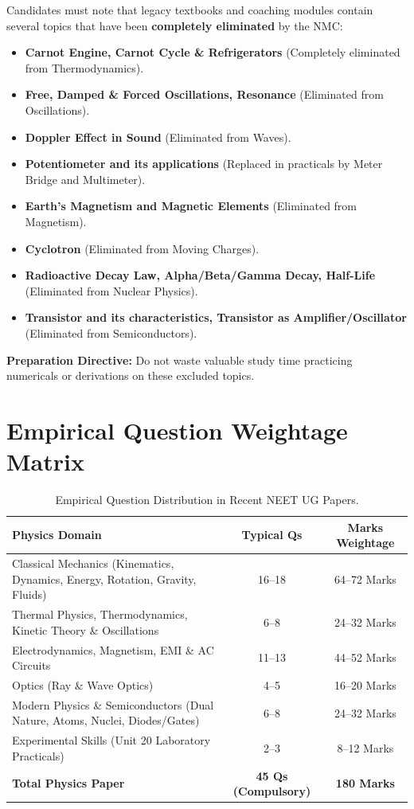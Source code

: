 \documentclass[10pt,twoside,openright]{book}
\begin{document}
\begin{trapbox}
Candidates must note that legacy textbooks and coaching modules contain several topics that have been \textbf{completely eliminated} by the NMC:
\begin{itemize}
  \item \textbf{Carnot Engine, Carnot Cycle \& Refrigerators} (Completely eliminated from Thermodynamics).
  \item \textbf{Free, Damped \& Forced Oscillations, Resonance} (Eliminated from Oscillations).
  \item \textbf{Doppler Effect in Sound} (Eliminated from Waves).
  \item \textbf{Potentiometer and its applications} (Replaced in practicals by Meter Bridge and Multimeter).
  \item \textbf{Earth's Magnetism and Magnetic Elements} (Eliminated from Magnetism).
  \item \textbf{Cyclotron} (Eliminated from Moving Charges).
  \item \textbf{Radioactive Decay Law, Alpha/Beta/Gamma Decay, Half-Life} (Eliminated from Nuclear Physics).
  \item \textbf{Transistor and its characteristics, Transistor as Amplifier/Oscillator} (Eliminated from Semiconductors).
\end{itemize}
\textbf{Preparation Directive:} Do not waste valuable study time practicing numericals or derivations on these excluded topics.
\end{trapbox}

\section*{Empirical Question Weightage Matrix}

\begin{table}[htbp]
\centering
\footnotesize
\setlength{\tabcolsep}{4pt}
\renewcommand{\arraystretch}{1.2}
\begin{tabularx}{\textwidth}{L c c}
\toprule
\textbf{Physics Domain} & \textbf{Typical Qs} & \textbf{Marks Weightage} \\
\midrule
Classical Mechanics (Kinematics, Dynamics, Energy, Rotation, Gravity, Fluids) & 16--18 & 64--72 Marks \\
Thermal Physics, Thermodynamics, Kinetic Theory \& Oscillations & 6--8 & 24--32 Marks \\
Electrodynamics, Magnetism, EMI \& AC Circuits & 11--13 & 44--52 Marks \\
Optics (Ray \& Wave Optics) & 4--5 & 16--20 Marks \\
Modern Physics \& Semiconductors (Dual Nature, Atoms, Nuclei, Diodes/Gates) & 6--8 & 24--32 Marks \\
Experimental Skills (Unit 20 Laboratory Practicals) & 2--3 & 8--12 Marks \\
\midrule
\textbf{Total Physics Paper} & \textbf{45 Qs (Compulsory)} & \textbf{180 Marks} \\
\bottomrule
\end{tabularx}
\caption{Empirical Question Distribution in Recent NEET UG Papers.}
\end{table}
\end{document}
